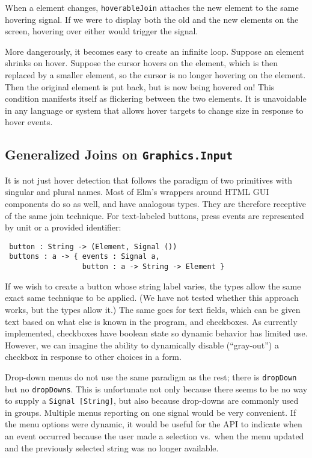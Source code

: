 \documentclass{article}
\begin{document}
When a element changes, \texttt{hoverableJoin} attaches the new element to the
same hovering signal. If we were to display both the old and the new elements on
the screen, hovering over either would trigger the signal.

More dangerously, it becomes easy to create an infinite loop. Suppose an
element shrinks on hover. Suppose the cursor hovers on the element,
which is then replaced by a smaller element, so the cursor is no longer
hovering on the element. Then the original element is put back, but is
now being hovered on! This condition manifests itself as flickering
between the two elements. It is unavoidable in any language or system
that allows hover targets to change size in response to hover events.

\subsection{Generalized Joins on \texttt{Graphics.Input}}

It is not just hover detection that follows the paradigm of two primitives
with singular and plural names. Most of Elm's wrappers around HTML GUI
components do so as well, and have analogous types. They are therefore receptive
of the same join technique. For text-labeled buttons, press events are
represented by unit or a provided identifier:

\begin{verbatim}
 button : String -> (Element, Signal ())
 buttons : a -> { events : Signal a,
                  button : a -> String -> Element }
\end{verbatim}

If we wish to create a button whose string label varies, the types allow
the same exact same technique to be applied. (We have not tested whether
this approach works, but the types allow it.) The same goes for text
fields, which can be given text based on what else is known in the
program, and checkboxes. As currently implemented, checkboxes have
boolean state so dynamic behavior has limited use. However, we can
imagine the ability to dynamically disable (``gray-out'') a checkbox in response
to other choices in a form.

Drop-down menus do not use the same paradigm as the rest; there is
\texttt{dropDown} but no \texttt{dropDowns}. This is unfortunate not
only because there seems to be no way to supply a
\texttt{Signal {[}String{]}}, but also because drop-downs are commonly used
in groups. Multiple menus reporting on one signal would be very
convenient. If the menu options were dynamic, it would be useful for the API to
indicate when an event occurred because the user made a selection vs.~when the
menu updated and the previously selected string was no longer available.
\end{document}
